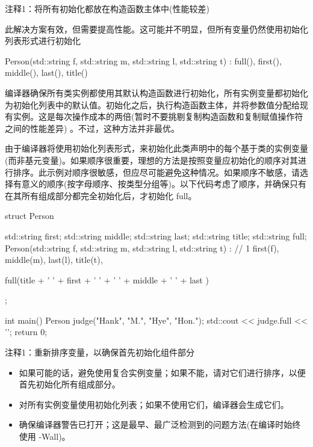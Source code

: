 {\footnotesize
注释1：将所有初始化都放在构造函数主体中(性能较差)
}

此解决方案有效，但需要提高性能。这可能并不明显，但所有变量仍然使用初始化列表形式进行初始化

\begin{cpp}
Person(std::string f, std::string m, std::string l, std::string t) :
  full(), first(), middle(), last(), title() {}
\end{cpp}

编译器确保所有类实例都使用其默认构造函数进行初始化，所有实例变量都初始化为初始化列表中的默认值。初始化之后，执行构造函数主体，并将参数值分配给现有实例。这是每次操作成本的两倍(暂时不要挑剔复制构造函数和复制赋值操作符之间的性能差异) 。不过，这种方法并非最优。


由于编译器将使用初始化列表形式，来初始化此类声明中的每个基于类的实例变量(而非基元变量)。如果顺序很重要，理想的方法是按照变量应初始化的顺序对其进行排序。此示例对顺序很敏感，但应尽可能避免这种情况。如果顺序不敏感，请选择有意义的顺序(按字母顺序、按类型分组等)。以下代码考虑了顺序，并确保只有在其所有组成部分都完全初始化后，才初始化 full。


\begin{cpp}
struct Person {
  std::string first;
  std::string middle;
  std::string last;
  std::string title;
  std::string full;
  Person(std::string f, std::string m, std::string l,
         std::string t) : // 1
    first(f), middle(m), last(l), title(t),

  full(title + ' ' + first + ' ' + ' ' + middle + ' ' + last ) {}
};

int main() {
  Person judge("Hank", "M.", "Hye", "Hon.");
  std::cout << judge.full << '\n';
  return 0;
}
\end{cpp}

{\footnotesize
注释1：重新排序变量，以确保首先初始化组件部分
}


\begin{itemize}
\item
如果可能的话，避免使用复合实例变量；如果不能，请对它们进行排序，以便首先初始化所有组成部分。

\item
对所有实例变量使用初始化列表；如果不使用它们，编译器会生成它们。

\item
确保编译器警告已打开；这是最早、最广泛检测到的问题方法(在编译时始终使用 -Wall)。
\end{itemize}














